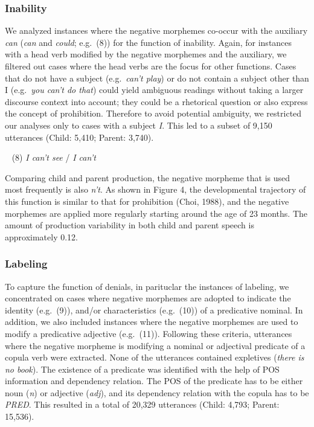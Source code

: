 \documentclass[
  english,
  man,floatsintext]{apa6}
\begin{document}
\hypertarget{inability}{%
\subsubsection{Inability}\label{inability}}

We analyzed instances where the negative morphemes co-occur with the auxiliary \emph{can} (\emph{can} and \emph{could}; e.g.~(8)) for the function of inability. Again, for instances with a head verb modified by the negative morphemes and the auxiliary, we filtered out cases where the head verbs are the focus for other functions. Cases that do not have a subject (e.g.~\emph{can't play}) or do not contain a subject other than I (e.g.~\emph{you can't do that}) could yield ambiguous readings without taking a larger discourse context into account; they could be a rhetorical question or also express the concept of prohibition. Therefore to avoid potential ambiguity, we restricted our analyses only to cases with a subject \emph{I}. This led to a subset of 9,150 utterances (Child: 5,410; Parent: 3,740).

~
(8) \emph{I can't see} / \emph{I can't}

Comparing child and parent production, the negative morpheme that is used most frequently is also \emph{n't}. As shown in Figure 4, the developmental trajectory of this function is similar to that for prohibition (Choi, 1988), and the negative morphemes are applied more regularly starting around the age of 23 months. The amount of production variability in both child and parent speech is approximately 0.12.

\hypertarget{labeling}{%
\subsubsection{Labeling}\label{labeling}}

To capture the function of denials, in parituclar the instances of labeling, we concentrated on cases where negative morphemes are adopted to indicate the identity (e.g.~(9)), and/or characteristics (e.g.~(10)) of a predicative nominal. In addition, we also included instances where the negative morphemes are used to modify a predicative adjective (e.g.~(11)). Following these criteria, utterances where the negative morpheme is modifying a nominal or adjectival predicate of a copula verb were extracted. None of the utterances contained expletives (\emph{there is no book}). The existence of a predicate was identified with the help of POS information and dependency relation. The POS of the predicate has to be either noun (\emph{n}) or adjective (\emph{adj}), and its dependency relation with the copula has to be \emph{PRED}. This resulted in a total of 20,329 utterances (Child: 4,793; Parent: 15,536).
\end{document}
